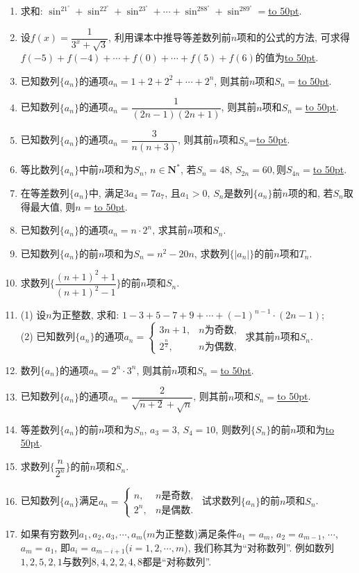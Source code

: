 \documentclass[10pt,a4paper]{article}
\newcommand{\blank}[1]{\underline{\hbox to #1pt{}}}
\begin{document}
\begin{enumerate}[1.]
\item 求和: $\sin^21^\circ +\sin^22^\circ+\sin^23^\circ+\cdots+\sin^288^\circ+\sin^289^\circ=$\blank{50}.
\item 设$f(x)=\dfrac 1{3^x+\sqrt 3}$, 利用课本中推导等差数列前$n$项和的公式的方法, 可求得$f(-5)+f(-4)+\cdots+f(0)+\cdots+f(5)+f(6)$的值为\blank{50}.
\item 已知数列$\{a_n\}$的通项$a_n=1+2+2^2+\cdots+2^n$, 则其前$n$项和$S_n=$\blank{50}.
\item 已知数列$\{a_n\}$的通项$a_n=\dfrac 1{(2n-1)(2n+1)}$, 则其前$n$项和$S_n=$\blank{50}.
\item 已知数列$\{a_n\}$的通项$a_n=\dfrac 3{n(n+3)}$, 则其前$n$项和$S_n$=\blank{50}.
\item 等比数列$\{a_n\}$中前$n$项和为$S_n$, $n\in \mathbf{N}^*$, 若$S_n=48$, $S_{2n}=60,$则$S_{4n}=$\blank{50}.
\item 在等差数列$\{a_n\}$中, 满足$3a_4=7a_7$, 且$a_1>0$, $S_n$是数列$\{a_n\}$前$n$项的和, 若$S_n$取得最大值, 则$n=$\blank{50}.
\item 已知数列$\{a_n\}$的通项$a_n=n\cdot 2^n$, 求其前$n$项和$S_n$.
\item 已知数列$\{a_n\}$的前$n$项和为$S_n=n^2-20n$, 求数列$\{|a_n|\}$的前$n$项和$T_n$.
\item 求数列$\{\dfrac{(n+1)^2+1}{(n+1)^2-1}\}$的前$n$项和$S_n$.
\item (1) 设$n$为正整数, 求和: $1-3+5-7+9+\cdots +(-1)^{n-1}\cdot (2n-1)$;\\
(2) 已知数列$\{a_n\}$的通项$a_n=\begin{cases}3n+1, & n\text{为奇数}, \\ 2^{\frac n2}, & n\text{为偶数},  \end{cases}$ 求其前$n$项和$S_n$.
\item 数列$\{a_n\}$的通项$a_n=2^n\cdot 3^n$, 则其前$n$项和$S_n=$\blank{50}.
\item 已知数列$\{a_n\}$的通项$a_n=\dfrac 2{\sqrt{n+2}+\sqrt n}$, 则其前$n$项和$S_n=$\blank{50}.
\item 等差数列$\{a_n\}$的前$n$项和为$S_n$, $a_3=3$, $S_4=10$, 则数列$\{S_n\}$的前$n$项和为\blank{50}.
\item 求数列$\{\dfrac n{2^n}\}$的前$n$项和$S_n$.
\item 已知数列$\{a_n\}$满足$a_n=\begin{cases}n, & n
\text{是奇数}, \\ 2^n, & n\text{是偶数}. \end{cases}$ 试求数列$\{a_n\}$的前$n$项和$S_n$.
\item 如果有穷数列$a_1,a_2,a_3,\cdots,a_m$($m$为正整数)满足条件$a_1=a_m$, $a_2=a_{m-1}$, $\cdots$, $a_m=a_1$, 即$a_i=a_{m-i+1}$($i=1,2,\cdots,m$), 我们称其为``对称数列''.  例如数列$1,2,5,2,1$与数列$8,4,2,2,4,8$都是``对称数列''.\\

\end{enumerate}
\end{document}
